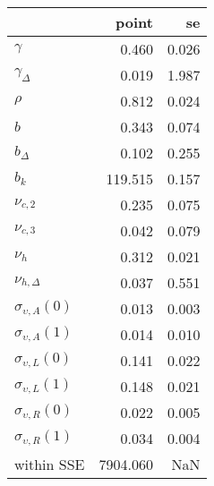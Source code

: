 \begin{tabular}{lrr}
\toprule
{} &     point &     se \\
\midrule
$\gamma$                 &     0.460 &  0.026 \\
$\gamma_{\Delta}$        &     0.019 &  1.987 \\
$\rho$                   &     0.812 &  0.024 \\
$b$                      &     0.343 &  0.074 \\
$b_{\Delta}$             &     0.102 &  0.255 \\
$b_k$                    &   119.515 &  0.157 \\
$\nu_{c,2}$              &     0.235 &  0.075 \\
$\nu_{c,3}$              &     0.042 &  0.079 \\
$\nu_{h}$                &     0.312 &  0.021 \\
$\nu_{h,\Delta}$         &     0.037 &  0.551 \\
$\sigma_{\upsilon,A}(0)$ &     0.013 &  0.003 \\
$\sigma_{\upsilon,A}(1)$ &     0.014 &  0.010 \\
$\sigma_{\upsilon,L}(0)$ &     0.141 &  0.022 \\
$\sigma_{\upsilon,L}(1)$ &     0.148 &  0.021 \\
$\sigma_{\upsilon,R}(0)$ &     0.022 &  0.005 \\
$\sigma_{\upsilon,R}(1)$ &     0.034 &  0.004 \\
within SSE               &  7904.060 &    NaN \\
\bottomrule
\end{tabular}
